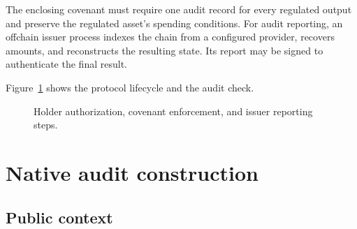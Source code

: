 \documentclass[11pt]{article}
\begin{document}
    The enclosing covenant must require one audit record for every regulated output and preserve the regulated asset's spending conditions.
    For audit reporting, an offchain issuer process indexes the chain from a configured provider, recovers amounts, and reconstructs the resulting state.
    Its report may be signed to authenticate the final result.

    Figure~\ref{fig:flow} shows the protocol lifecycle and the audit check.

    \begin{figure}[ht]
        \centering
        \caption{Holder authorization, covenant enforcement, and issuer reporting steps.}
        \label{fig:flow}
    \end{figure}


    \FloatBarrier
    \section{Native audit construction}
    \label{sec:construction}

    \subsection{Public context}
    \label{sec:statement-proof}
\end{document}
